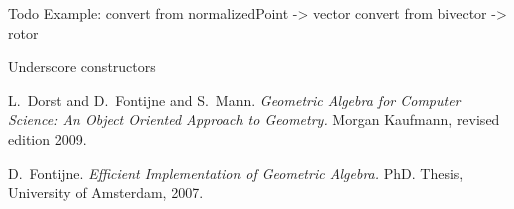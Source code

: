 \documentclass[10pt, a4paper]{article}
\begin{document}
Todo
Example: convert from normalizedPoint -> vector
convert from bivector -> rotor

Underscore constructors



\iffalse
\section{Why did you write Gaigen 2.5 in C\#?}

I wrote Gaigen 2.5 in C\# because I wanted to try out the .Net platform
(it's pretty nice).
I assumed that Mono would be good enough to run Gaigen 2.5 on OS X and
Linux, but it is slightly disappointing in speed. Hopefully the Mono
team will improve Mono's performance in the future.
\fi



\begin{thebibliography}{}


	
 L.~Dorst and D.~Fontijne and S.~Mann.
	\emph{Geometric Algebra for Computer Science: An Object Oriented Approach to Geometry.}
	Morgan Kaufmann, revised edition 2009.

 D.~Fontijne.
	\emph{Efficient Implementation of Geometric Algebra.}
	PhD. Thesis, University of Amsterdam, 2007.


\end{thebibliography}
\end{document}
